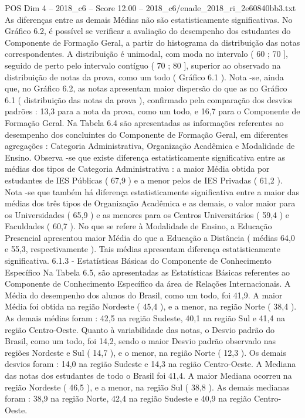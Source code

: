 \begin{textsample}{POS Dim 4 – 2018\_c6 – Score 12.00 – 2018\_c6/enade\_2018\_ri\_2e60840bb3.txt}
As diferenças entre as demais Médias não são estatisticamente significativas.
No Gráfico 6.2, é possível se verificar a avaliação do desempenho dos estudantes do Componente de Formação Geral, a partir do histograma da distribuição das notas correspondentes.
A distribuição é unimodal, com moda no intervalo ( 60 ; 70 ], seguido de perto pelo intervalo contíguo ( 70 ; 80 ], superior ao observado na distribuição de notas da prova, como um todo ( Gráfico 6.1 ).
Nota -se, ainda que, no Gráfico 6.2, as notas apresentam maior dispersão do que as no Gráfico 6.1 ( distribuição das notas da prova ), confirmado pela comparação dos desvios padrões : 13,3 para a nota da prova, como um todo, e 16,7 para o Componente de Formação Geral.
Na Tabela 6.4 são apresentadas as informações referentes ao desempenho dos concluintes do Componente de Formação Geral, em diferentes agregações : Categoria Administrativa, Organização Acadêmica e Modalidade de Ensino.
Observa -se que existe diferença estatisticamente significativa entre as médias dos tipos de Categoria Administrativa : a maior Média obtida por estudantes de IES Públicas ( 67,9 ) e a menor pelos de IES Privadas ( 61,2 ).
Nota -se que também há diferença estatisticamente significativa entre a maior das médias dos três tipos de Organização Acadêmica e as demais, o valor maior para os Universidades ( 65,9 ) e as menores para os Centros Universitários ( 59,4 ) e Faculdades ( 60,7 ).
No que se refere à Modalidade de Ensino, a Educação Presencial apresentou maior Média do que a Educação a Distância ( médias 64,0 e 55,3, respectivamente ).
Tais médias apresentam diferença estatisticamente significativa. 6.1.3 - Estatísticas Básicas do Componente de Conhecimento Específico Na Tabela 6.5, são apresentadas as Estatísticas Básicas referentes ao Componente de Conhecimento Específico da área de Relações Internacionais.
A Média do desempenho dos alunos do Brasil, como um todo, foi 41,9.
A maior Média foi obtida na região Nordeste ( 45,4 ), e a menor, na região Norte ( 38,4 ).
As demais médias foram : 42,5 na região Sudeste, 40,1 na região Sul e 41,4 na região Centro-Oeste.
Quanto à variabilidade das notas, o Desvio padrão do Brasil, como um todo, foi 14,2, sendo o maior Desvio padrão observado nas regiões Nordeste e Sul ( 14,7 ), e o menor, na região Norte ( 12,3 ).
Os demais desvios foram : 14,0 na região Sudeste e 14,3 na região Centro-Oeste.
A Mediana das notas dos estudantes de todo o Brasil foi 41,4.
A maior Mediana ocorreu na região Nordeste ( 46,5 ), e a menor, na região Sul ( 38,8 ).
As demais medianas foram : 38,9 na região Norte, 42,4 na região Sudeste e 40,9 na região Centro-Oeste.

\end{textsample}
